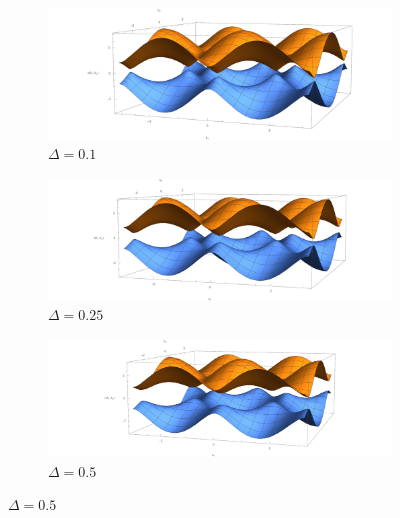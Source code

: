 \documentclass{article}
\begin{document}
\begin{figure}
\centering
\begin{subfigure}[b]{1.2\textwidth}
\centering
\includegraphics[width=\textwidth]{graphene_01_2.png}
\caption{$\Delta=0.1$}
\end{subfigure}	 
\begin{subfigure}[b]{1.2\textwidth}
\centering
\includegraphics[width=\textwidth]{graphene_025.png}
\caption{$\Delta=0.25$}
\end{subfigure}	
\begin{subfigure}[b]{1.2\textwidth}
\centering
\includegraphics[width=\textwidth]{graphene_05.png}
\caption{$\Delta=0.5$}
\end{subfigure}	  
\end{figure}
\end{document}
